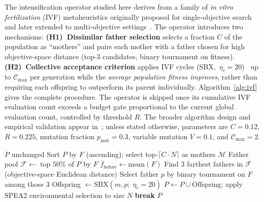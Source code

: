 \documentclass[runningheads]{llncs}
\begin{document}
The intensification operator studied here derives from a family of
\emph{in vitro fertilization} (IVF) metaheuristics originally proposed for
single-objective search and later extended to multi-objective
settings~\cite{camilo-junior2011,sampaio2017ivf,sampaio2019ivf,Sampaio2024}.
The operator introduces two mechanisms:
\textbf{(H1)~Dissimilar father selection} selects a fraction $C$ of the
population as ``mothers'' and pairs each mother with a father chosen for high
objective-space distance (top-3 candidates, binary tournament on fitness).
\textbf{(H2)~Collective acceptance criterion} applies IVF cycles
(SBX,~$\eta_c\!=\!20$)~\cite{deb1995simulated} up to
$\mathcal{C}_{\max}$ per generation while the \emph{average population
	fitness improves}, rather than requiring each offspring to outperform its
parent individually.
Algorithm~\ref{alg:ivf} gives the complete procedure.
The operator is skipped once its cumulative IVF evaluation count exceeds a
budget gate proportional to the current global evaluation count, controlled by
threshold $R$. The broader algorithm design and empirical validation
appear in~\cite{zambrano2026ivfspea2}; unless stated otherwise, parameters are
$C\!=\!0.12$, $R\!=\!0.225$, mutation fraction
$p_{\mathrm{mut}}\!=\!0.3$, variable mutation $V\!=\!0.1$,
and $\mathcal{C}_{\max}\!=\!2$.

\begin{algorithm}[t]
\caption{IVF operator (one generation). Input: population $P$, SPEA2
fitness vector $F$, parameters $C$, $R$, $\mathcal{C}_{\max}$.
Returns updated $P$.}\label{alg:ivf}
\begin{algorithmic}[1]
  \State \Return $P$ unchanged 
\EndIf
\State Sort $P$ by $F$ (ascending); select top-$\lceil C \!\cdot\! N \rceil$ as mothers $\mathcal{M}$
\State Father pool $\mathcal{F} \gets$ top 50\% of $P$ by $F$
  \State $\bar{f}_{\mathrm{before}} \gets \mathrm{mean}(F)$
   
    \State Find 3 farthest fathers in $\mathcal{F}$ (objective-space Euclidean distance)
    \State Select father $p$ by binary tournament on $F$ among those 3
    \State Offspring $\gets \mathrm{SBX}(m, p;\; \eta_c\!=\!20)$
  \EndFor
  \State $P \gets P \cup \mathrm{Offspring}$; apply SPEA2 environmental selection to size $N$
   
    \State \textbf{break} 
  \EndIf
\EndFor
\State \Return $P$
\end{algorithmic}
\end{algorithm}
\end{document}
